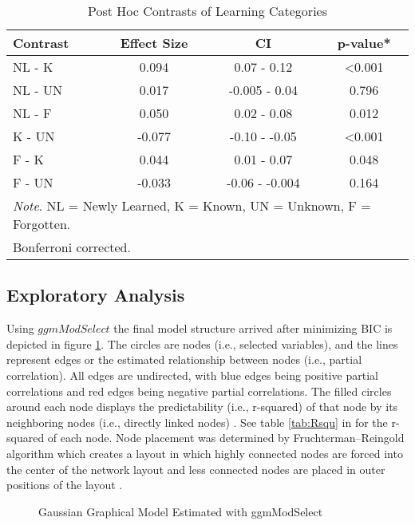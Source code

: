 \begin{table}
\centering
\begin{tabular}{lccc}
\hline
\textbf{Contrast}            & \textbf{Effect Size} & \textbf{CI}          & \textbf{p-value*}          \\ \hline
NL - K                    & 0.094         & 0.07 - 0.12                &  \textless{}0.001 \\
NL - UN                          & 0.017              & -0.005 - 0.04                  & 0.796 \\
NL - F                          & 0.050         & 0.02 - 0.08                         & 0.012 \\
K - UN                     & -0.077         & -0.10 - -0.05                           & \textless{}0.001 \\
F - K                   & 0.044         & 0.01 - 0.07                       & 0.048 \\
F - UN                 & -0.033                      & -0.06 - -0.004                & 0.164             \\ \hline
\multicolumn{4}{l}{\small \textit{Note}. NL = Newly Learned, K = Known, UN = Unknown, F = Forgotten.}\\[-0.3cm]
\multicolumn{4}{l}{\small *Bonferroni corrected.}\\
\end{tabular}
\caption{Post Hoc Contrasts of Learning Categories}
\label{tab:posthoc}
\end{table}
\subsection{Exploratory Analysis}

Using $ggmModSelect$ the final model structure arrived after minimizing BIC is depicted in figure \ref{fig:net}. The circles are nodes (i.e., selected variables), and the lines represent edges or the estimated relationship between nodes (i.e., partial correlation). All edges are undirected, with blue edges being positive partial correlations and red edges being negative partial correlations. The filled circles around each node displays the predictability (i.e., r-squared) of that node by its neighboring nodes (i.e., directly linked nodes) \parencite{haslbeckHowPredictableAre2017}. See table \ref{tab:Rsqu} in  for the r-squared of each node. Node placement was determined by Fruchterman–Reingold algorithm \parencite{fruchtermanGraphDrawingForcedirected1991} which creates a layout in which highly connected nodes are forced into the center of the network layout and less connected nodes are placed in outer positions of the layout \parencite{epskampQgraphNetworkVisualizations2012}. 
\begin{figure}[H]
    \centering  
       
    \caption{Gaussian Graphical Model Estimated with ggmModSelect}
    \label{fig:net}
\end{figure}

